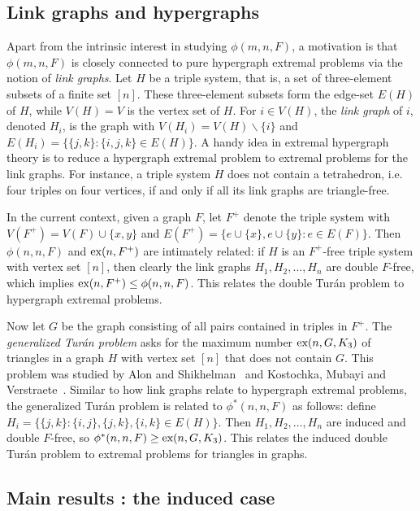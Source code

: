 \documentclass[12pt]{article}
\newcommand*{\ex}{\textnormal{ex}}
\begin{document}
\subsection{Link graphs and hypergraphs}

Apart from the intrinsic interest in studying $\phi(m, n, F)$, a motivation is that $\phi(m, n, F)$ is closely connected to pure hypergraph extremal problems via the notion of \textit{link graphs}. Let $H$ be a triple system, that is, a set of three-element subsets of a finite set $[n]$. These three-element subsets form the edge-set $E(H)$ of $H$, while $V(H) = V$ is the vertex set of $H$. For $i \in V(H)$, the \textit{link graph} of $i$,  denoted $H_i$, is the graph with $V(H_i) = V(H) \backslash \{i\}$ and $E(H_i) = \{\{j, k\} : \{i, j, k\} \in E(H)\}$. A handy idea in extremal hypergraph theory is to reduce a hypergraph extremal problem to extremal problems for the link graphs. For instance, a triple system $H$ does not contain a tetrahedron, i.e. four triples on four vertices, if and only if all its link graphs are triangle-free.

In the current context, given a graph $F$, let $F^+$ denote the triple system with $V(F^+) = V(F) \cup \{x, y\}$ and $E(F^+) = \{e \cup \{x\}, e \cup \{y\} : e \in E(F)\}$. Then $\phi(n, n, F)$ and $\ex(n, F^+)$ are intimately related: if $H$ is an $F^+$-free triple system with vertex set $[n]$, then clearly the link graphs $H_1, H_2, \dots, H_n$ are double $F$-free, which implies $\ex(n, F^+) \leq \phi(n, n, F)$. This relates the double Tur\'{a}n problem to hypergraph extremal problems.

Now let $G$ be the graph consisting of all pairs contained in triples in $F^+$. The \textit{generalized Tur\'{a}n problem} asks for the maximum number $\ex(n, G, K_3)$ of triangles in a graph $H$ with vertex set $[n]$ that does not contain $G$. This problem was studied by Alon and Shikhelman~\cite{AlonShikhelman2016} and Kostochka, Mubayi and Verstraete~\cite{KostochkaMubayiV2015,MubayiMukherjee2023,MubayiV2016}. Similar to how link graphs relate to hypergraph extremal problems, the generalized Tur\'{a}n problem is related to $\phi^*(n, n, F)$ as follows: define $H_i = \{\{j, k\} : \{i, j\}, \{j, k\}, \{i, k\} \in E(H)\}$. Then $H_1, H_2, \dots, H_n$ are induced and double $F$-free, so $\phi^*(n, n, F) \geq \ex(n, G, K_3)$. This relates the induced double Tur\'{a}n problem to extremal problems for triangles in graphs.

\subsection{Main results : the induced case}
\end{document}
